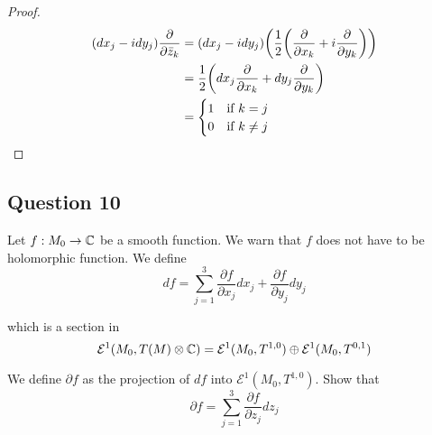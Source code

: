 \documentclass{article}
\begin{document}
\begin{proof}
\begin{align*}
    (dx_j - i dy_j) \frac{\partial}{\partial \bar{z}_k}
    &= (dx_j - i dy_j) \tuple*{\frac{1}{2} \tuple*{\frac{\partial}{\partial x_k}  + i \frac{\partial}{\partial y_k}}} \\
    &= \frac{1}{2} \tuple*{dx_j \frac{\partial}{\partial x_k} + dy_j \frac{\partial}{\partial y_k}} \\
    &= \begin{cases}
        1 &\text{if $k = j$} \\
        0 &\text{if $k \neq j$}
    \end{cases}
\end{align*}

\end{proof}

\subsection{Question 10}
Let $f: M_0 \to \mathbb{C}$ be a smooth function. We warn that $f$ does not have to be holomorphic function. We define
$$
    df = \sum_{j=1}^3 \frac{\partial f}{\partial x_j} dx_j + \frac{\partial f }{\partial y_j} dy_j
$$

which is a section in 
$$
    \mathcal{E}^1(M_0, T(M) \otimes \mathbb{C}) = \mathcal{E}^1(M_0, T^{1, 0}) \oplus \mathcal{E}^1(M_0, T^{0, 1})
$$

We define $\partial f$ as the projection of $df$ into $\mathcal{E}^1(M_0, T^{1, 0})$. Show that
$$
    \partial f = \sum_{j=1}^3 \frac{\partial f}{\partial z_j} dz_j
$$
\end{document}
